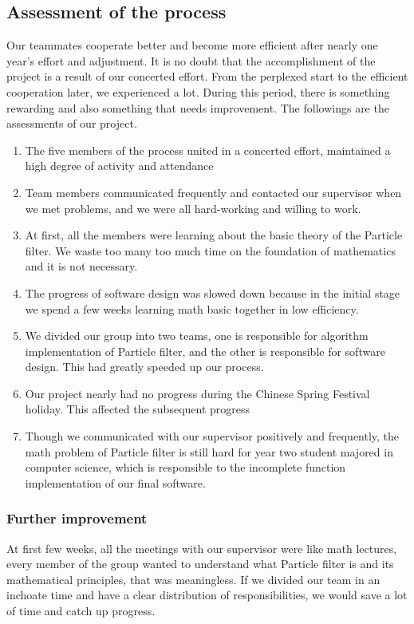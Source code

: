\documentclass[11pt,oneside,a4paper]{article}
\begin{document}
\subsection{Assessment of the process}
Our teammates cooperate better and become more efficient after nearly one year's effort and adjustment. It is no doubt that the accomplishment of the project is a result of our concerted effort. From the perplexed start to the efficient cooperation later, we experienced a lot. During this period, there is something rewarding and also something that needs improvement. The followings are the assessments of our project.
\begin{enumerate}
  \item The five members of the process united in a concerted effort, maintained a high degree of activity and attendance
  \item Team members communicated frequently and contacted our supervisor when we met problems, and we were all hard-working and willing to work.
  \item At first, all the members were learning about the basic theory of the Particle filter. We waste too many too much time on the foundation of mathematics and it is not necessary.
  \item The progress of software design was slowed down because in the initial stage we spend a few weeks learning math basic together in low efficiency.
  \item We divided our group into two teams, one is responsible for algorithm implementation of Particle filter, and the other is responsible for software design. This had greatly speeded up our process.
  \item Our project nearly had no progress during the Chinese Spring Festival holiday. This affected the subsequent progress
  \item Though we communicated with our supervisor positively and frequently, the math problem of Particle filter is still hard for year two student majored in computer science, which is responsible to the incomplete function implementation of our final software.
\end{enumerate}

\subsubsection{Further improvement}
At first few weeks, all the meetings with our supervisor were like math lectures, every member of the group wanted to understand what Particle filter is and its mathematical principles, that was meaningless. If we divided our team in an inchoate time and have a clear distribution of responsibilities, we would save a lot of time and catch up progress.
\end{document}
